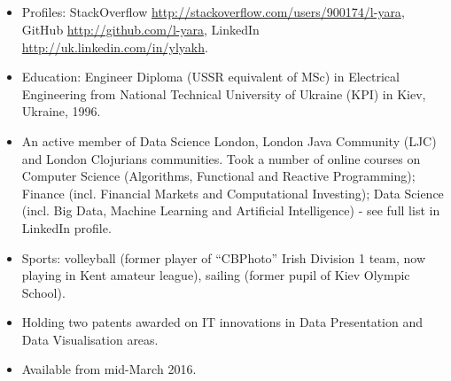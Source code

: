 \documentclass{res}
\newcommand{\osection}[1]{\section{\sc {\Large \textbf{#1}\\}} \vspace{0.30cm}}
\begin{document}
\begin{resume}
\osection{SPECIALS}
\begin{itemize}
 \item Profiles: StackOverflow \url{http://stackoverflow.com/users/900174/l-yara}, GitHub \url{http://github.com/l-yara}, LinkedIn \url{http://uk.linkedin.com/in/ylyakh}.
 \item Education: Engineer Diploma (USSR equivalent of MSc) in Electrical Engineering from National Technical University of Ukraine (KPI) in Kiev, Ukraine, 1996.
 \item An active member of Data Science London, London Java Community (LJC) and London Clojurians communities. Took a number of online courses on Computer Science (Algorithms, Functional and Reactive Programming); Finance (incl. Financial Markets and Computational Investing); Data Science (incl. Big Data, Machine Learning and Artificial Intelligence) - see full list in LinkedIn profile.
 \item Sports: volleyball (former player of ``CBPhoto'' Irish Division 1 team, now playing in Kent amateur league), sailing (former pupil of Kiev Olympic School).
\item Holding two patents awarded on IT innovations in Data Presentation and Data Visualisation areas.
\item Available from mid-March 2016.
\end{itemize}


\end{resume}
\end{document}
